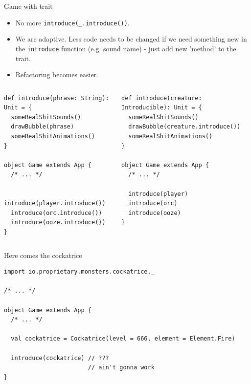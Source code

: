 \documentclass[presentation,aspectratio=169,smaller]{beamer}
\begin{document}
\begin{frame}[label={sec:org9431350},fragile]{Game with trait}
 \begin{itemize}
\item No more \texttt{introduce(\_.introduce())}.
\item We are adaptive. Less code needs to be changed if we need something new in the
\texttt{introduce} function (e.g. sound name) - just add new 'method' to the trait.
\item Refactoring becomes easier.
\end{itemize}

\begin{columns}
\begin{column}[t]{0.5\columnwidth}
\begin{verbatim}
def introduce(phrase: String): Unit = {
  someRealShitSounds()
  drawBubble(phrase)
  someRealShitAnimations()
}

object Game extends App {
  /* ... */

  introduce(player.introduce())
  introduce(orc.introduce())
  introduce(ooze.introduce())
}
\end{verbatim}
\end{column}

\begin{column}[t]{0.5\columnwidth}
\begin{verbatim}
def introduce(creature: Introducible): Unit = {
  someRealShitSounds()
  drawBubble(creature.introduce())
  someRealShitAnimations()
}

object Game extends App {
  /* ... */

  introduce(player)
  introduce(orc)
  introduce(ooze)
}
\end{verbatim}
\end{column}
\end{columns}
\end{frame}

\begin{frame}[label={sec:org4614cc5},fragile]{Here comes the cockatrice}
 \begin{verbatim}
import io.proprietary.monsters.cockatrice._

/* ... */

object Game extends App {
  /* ... */

  val cockatrice = Cockatrice(level = 666, element = Element.Fire)

  introduce(cockatrice) // ???
                        // ain't gonna work
}
\end{verbatim}
\end{frame}
\end{document}
